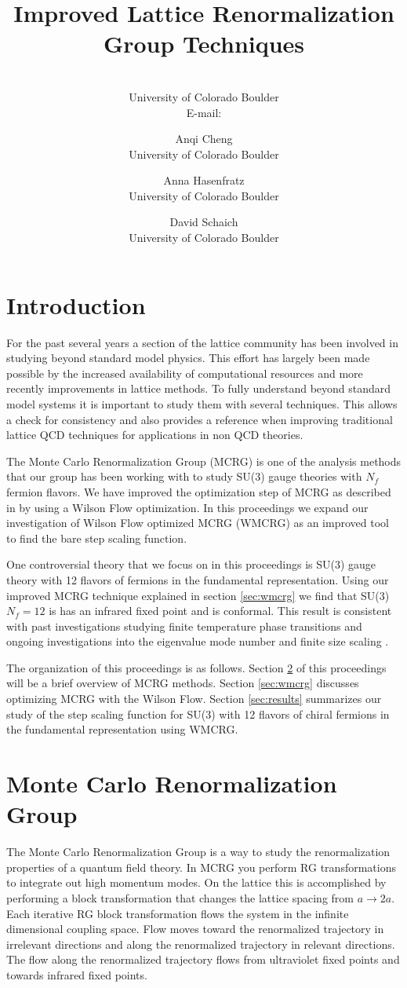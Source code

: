 \documentclass{PoS}
\title{Improved Lattice Renormalization Group Techniques}
\author{\speaker{Gregory Petropoulos}\\
        University of Colorado Boulder\\
        E-mail: \email{gregory.petropoulos@colorado.edu}}
\author{Anqi Cheng\\
        University of Colorado Boulder}
\author{Anna Hasenfratz\\
        University of Colorado Boulder}
\author{David Schaich\\
        University of Colorado Boulder}
\begin{document}
\section{Introduction}
For the past several years a section of the lattice community has been involved in studying beyond standard model physics.  
This effort has largely been made possible by the increased availability of computational resources and more recently improvements in lattice methods.
To fully understand beyond standard model systems it is important to study them with several techniques.
This allows a check for consistency and also provides a reference when improving traditional lattice QCD techniques for applications in non QCD theories.

The Monte Carlo Renormalization Group (MCRG) is one of the analysis methods that our group has been working with to study SU(3) gauge theories with $N_f$ fermion flavors.
We have improved the optimization step of MCRG as described in \cite{last year} by using a Wilson Flow optimization.
In this proceedings we expand our investigation of Wilson Flow optimized MCRG (WMCRG) as an improved tool to find the bare step scaling function.

One controversial theory that we focus on in this proceedings is SU(3) gauge theory with 12 flavors of fermions in the fundamental representation.
Using our improved MCRG technique explained in section \ref{sec:wmcrg} we find that SU(3) $N_f=12$ is has an infrared fixed point and is conformal.
This result is consistent with past investigations studying finite temperature phase transitions \cite{} and ongoing investigations into the eigenvalue mode number \cite{} and finite size scaling \cite{}.

The organization of this proceedings is as follows.
Section \ref{sec:mcrg} of this proceedings will be a brief overview of MCRG methods.  
Section \ref{sec:wmcrg} discusses optimizing MCRG with the Wilson Flow.  
Section \ref{sec:results} summarizes our study of the step scaling function for SU(3) with 12 flavors of chiral fermions in the fundamental representation using WMCRG.

\section{Monte Carlo Renormalization Group}
\label{sec:mcrg}
The Monte Carlo Renormalization Group is a way to study the renormalization properties of a quantum field theory.
In MCRG you perform RG transformations to integrate out high momentum modes.
On the lattice this is accomplished by performing a block transformation that changes the lattice spacing from $a \rightarrow 2a$.
Each iterative RG block transformation flows the system in the infinite dimensional coupling space.
Flow moves toward the renormalized trajectory in irrelevant directions and along the renormalized trajectory in relevant directions.
The flow along the renormalized trajectory flows from ultraviolet fixed points and towards infrared fixed points.
\end{document}
